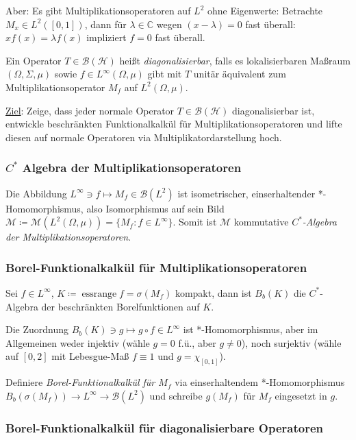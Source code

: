 \documentclass[11pt,a4paper]{scrartcl}
\newcommand{\C}{\mathbb{C}} %
\newcommand{\Hc}{\mathcal{H}}
\newcommand{\B}{\mathcal{B}}
\newcommand{\M}{\mathcal{M}}
\theoremstyle{plain}
\theoremstyle{definition}
\theoremstyle{remark}
\DeclareMathOperator{\essrange}{ess range}
\begin{document}
Aber: Es gibt Multiplikationsoperatoren auf $L^2$ ohne Eigenwerte: Betrachte $M_x \in L^2([0,1])$, dann für $\lambda\in\C$ wegen $(x-\lambda)=0$ fast überall: $x f(x) = \lambda f(x)$ impliziert $f=0$ fast überall.

Ein Operator $T\in \B(\Hc)$ heißt \emph{diagonalisierbar}, falls es lokalisierbaren Maßraum $(\Omega, \Sigma, \mu)$ sowie $f\in L^\infty(\Omega, \mu)$ gibt mit $T$ unitär äquivalent zum Multiplikationsoperator $M_f$ auf $L^2(\Omega, \mu)$.

\underline{Ziel}: Zeige, dass jeder normale Operator $T\in \B(\Hc)$ diagonalisierbar ist, entwickle beschränkten Funktionalkalkül für Multiplikationsoperatoren und lifte diesen auf normale Operatoren via Multiplikatordarstellung hoch.

\subsubsection{$C^*$ Algebra der Multiplikationsoperatoren}

Die Abbildung $L^\infty \ni f \mapsto M_f \in \B(L^2)$ ist isometrischer, einserhaltender *-Homomorphismus, also Isomorphismus auf sein Bild $\M\coloneqq \M(L^2(\Omega,\mu))=\{ M_f: f\in L^\infty \}$. Somit ist $\M$ kommutative \emph{$C^*$-Algebra der Multiplikationsoperatoren}.

\subsubsection{Borel-Funktionalkalkül für Multiplikationsoperatoren}

Sei $f\in L^\infty$, $K\coloneqq \essrange f = \sigma(M_f)$ kompakt, dann ist $B_b(K)$ die $C^*$-Algebra der beschränkten Borelfunktionen auf $K$. 

Die Zuordnung $B_b(K) \ni g \mapsto g\circ f \in L^\infty$ ist *-Homomorphismus, aber im Allgemeinen weder injektiv (wähle $g=0$ f.ü., aber $g\neq 0$), noch surjektiv (wähle auf $[0,2]$ mit Lebesgue-Maß $f\equiv 1$ und $g=\chi_{[0,1]}$).

Definiere \emph{Borel-Funktionalkalkül für $M_f$} via einserhaltendem *-Homomorphismus $B_b(\sigma(M_f)) \to L^\infty \to \B(L^2)$ und schreibe $g(M_f)$ für $M_f$ eingesetzt in $g$. 

\subsubsection{Borel-Funktionalkalkül für diagonalisierbare Operatoren}
\end{document}
